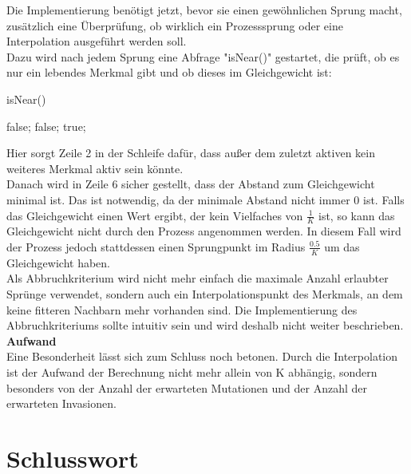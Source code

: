 \documentclass[11pt, a4paper, german]{article}
\theoremstyle{plain}
\begin{document}
	Die Implementierung benötigt jetzt, bevor sie einen gewöhnlichen Sprung macht, zusätzlich eine Überprüfung, ob wirklich ein Prozesssprung oder eine Interpolation ausgeführt werden soll.\\
	Dazu wird nach jedem Sprung eine Abfrage "{}isNear()" gestartet, die prüft, ob es nur ein lebendes Merkmal gibt und ob dieses im Gleichgewicht ist:
	\begin{algorithm}[H]
		\caption{isNear()}
		\begin{algorithmic}[1]
					\State \Return false;
				\EndIf
			\EndFor
				\State \Return false;
			\EndIf
			\State \Return true;
		\end{algorithmic}
	\end{algorithm}
	Hier sorgt Zeile 2 in der Schleife dafür, dass außer dem zuletzt aktiven kein weiteres Merkmal aktiv sein könnte.\\
	Danach wird in Zeile 6 sicher gestellt, dass der Abstand zum Gleichgewicht minimal ist. Das ist notwendig, da der minimale Abstand nicht immer $ 0 $ ist. Falls das Gleichgewicht einen Wert ergibt, der kein Vielfaches von $ \frac{1}{K} $ ist, so kann das Gleichgewicht nicht durch den Prozess angenommen werden. In diesem Fall wird der Prozess jedoch stattdessen einen Sprungpunkt im Radius $ \frac{0.5}{K} $ um das Gleichgewicht haben.\\
	Als Abbruchkriterium wird nicht mehr einfach die maximale Anzahl erlaubter Sprünge verwendet, sondern auch ein Interpolationspunkt des Merkmals, an dem keine fitteren Nachbarn mehr vorhanden sind. Die Implementierung des Abbruchkriteriums sollte intuitiv sein und wird deshalb nicht weiter beschrieben.\\
	
	\textbf{Aufwand}\\
	Eine Besonderheit lässt sich zum Schluss noch betonen. Durch die Interpolation ist der Aufwand der Berechnung nicht mehr allein von K abhängig, sondern besonders von der Anzahl der erwarteten Mutationen und der Anzahl der erwarteten Invasionen.
	

\section{Schlusswort}
\end{document}
